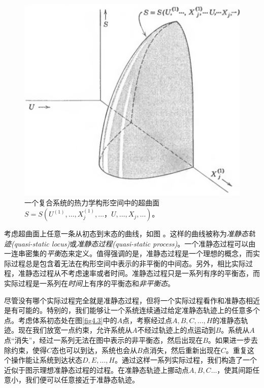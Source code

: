 \begin{figure}
\includegraphics[width=.8\textwidth]{Pictures/fig4.2.png}
\caption{一个复合系统的热力学构形空间中的超曲面$S=S(U^{(1)}, \dots, X^{(1)}_j,\dots，U, \dots, X_j,\dots)$。}
\label{fig4.2}
\end{figure}

考虑超曲面上任意一条从初态到末态的曲线，如图 。这样的曲线被称为{\it 准静态轨迹(quasi-static locus)}或{\it 准静态过程(quasi-static process)}。一个准静态过程可以由一连串密集的{\it 平衡}态来定义。值得强调的是，准静态过程是一个理想的概念，而实际过程总是包含着无法在构形空间中表示的非平衡的中间态。另外，相比实际过程，准静态过程从不考虑速率或者时间。准静态过程只是一系列有序的平衡态，而实际过程是一系列在{\it 时间}上有序的平衡态和{\it 非平衡态}。

尽管没有哪个实际过程完全就是准静态过程，但将一个实际过程看作和准静态相近是有可能的。特别的，我们能够让一个系统连续通过给定准静态轨迹上的任意多个点。考虑体系初态处在图\ref{fig4.3}中的$A$点，考察经过点$A, B, C,\dots ,H$的准静态轨迹。现在我们放宽一点约束，允许系统从$A$不经过轨迹上的点运动到$B$。系统从$A$点“消失”，经过一系列无法在图中表示的非平衡态，然后出现在$B$。如果进一步去除约束，使得$C$态也可以到达，系统也会从$B$点消失，然后重新出现在$C$。重复这个操作能让系统到达状态$D,E,\dots ,H$。通过这样一系列实际过程，我们构造了一个近似于图示理想准静态过程的过程。在准静态轨迹上挪动点$A,B,C\dots$，使其间距任意小，我们便可以任意接近于准静态轨迹。

